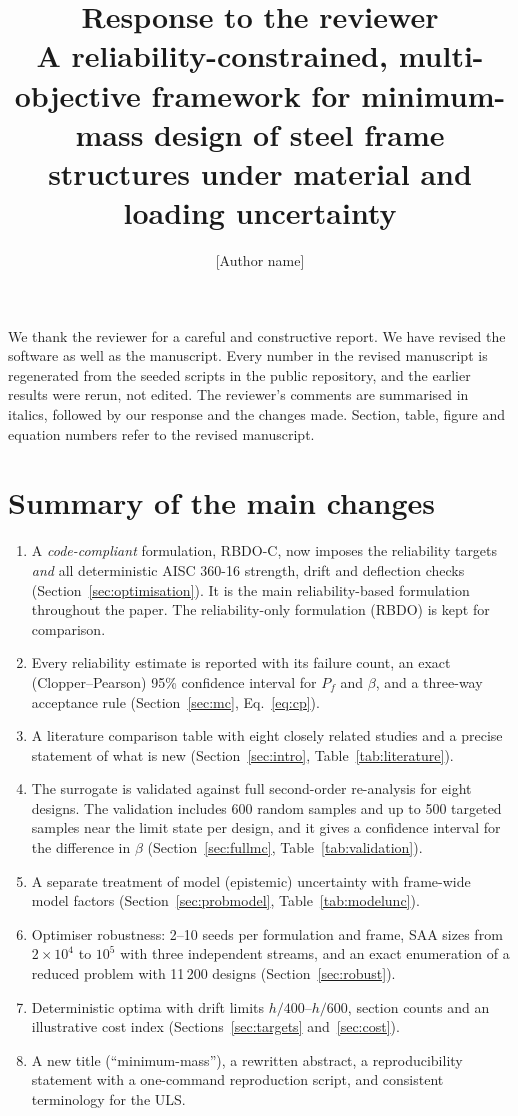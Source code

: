 \documentclass[11pt]{article}
\title{Response to the reviewer\\[0.3em]\large A reliability-constrained, multi-objective framework for
minimum-mass design of steel frame structures under material and loading uncertainty}
\author{[Author name]}
\date{}
\begin{document}
\maketitle

We thank the reviewer for a careful and constructive report. We have revised the software as well as the
manuscript. Every number in the revised manuscript is regenerated from the seeded scripts in the public
repository, and the earlier results were rerun, not edited. The reviewer's comments are summarised in
italics, followed by our response and the changes made. Section, table, figure and equation numbers refer
to the revised manuscript.

\section*{Summary of the main changes}
\begin{enumerate}[leftmargin=1.5em,itemsep=0.1em]
\item A \emph{code-compliant} formulation, RBDO-C, now imposes the reliability targets \emph{and} all
deterministic AISC 360-16 strength, drift and deflection checks (Section~\ref{sec:optimisation}). It is
the main reliability-based formulation throughout the paper. The reliability-only formulation (RBDO) is
kept for comparison.
\item Every reliability estimate is reported with its failure count, an exact (Clopper--Pearson) 95\%
confidence interval for $P_f$ and $\beta$, and a three-way acceptance rule (Section~\ref{sec:mc},
Eq.~\eqref{eq:cp}).
\item A literature comparison table with eight closely related studies and a precise statement of what
is new (Section~\ref{sec:intro}, Table~\ref{tab:literature}).
\item The surrogate is validated against full second-order re-analysis for eight designs. The
validation includes 600 random samples and up to 500 targeted samples near the limit state per
design, and it gives a confidence interval for the difference in $\beta$ (Section~\ref{sec:fullmc},
Table~\ref{tab:validation}).
\item A separate treatment of model (epistemic) uncertainty with frame-wide model factors
(Section~\ref{sec:probmodel}, Table~\ref{tab:modelunc}).
\item Optimiser robustness: 2--10 seeds per formulation and frame, SAA sizes from $2\times10^4$ to
$10^5$ with three independent streams, and an exact enumeration of a reduced problem with 11\,200
designs (Section~\ref{sec:robust}).
\item Deterministic optima with drift limits $h/400$--$h/600$, section counts and an illustrative
cost index (Sections~\ref{sec:targets} and~\ref{sec:cost}).
\item A new title (``minimum-mass''), a rewritten abstract, a reproducibility statement with a
one-command reproduction script, and consistent terminology for the ULS.
\end{enumerate}
\end{document}
